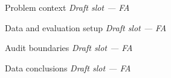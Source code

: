 \begin{frame}{Problem context}
  \centering\textit{Draft slot --- FA}
\end{frame}
\begin{frame}{Data and evaluation setup}
  \centering\textit{Draft slot --- FA}
\end{frame}
\begin{frame}{Audit boundaries}
  \centering\textit{Draft slot --- FA}
\end{frame}
\begin{frame}{Data conclusions}
  \centering\textit{Draft slot --- FA}
\end{frame}
